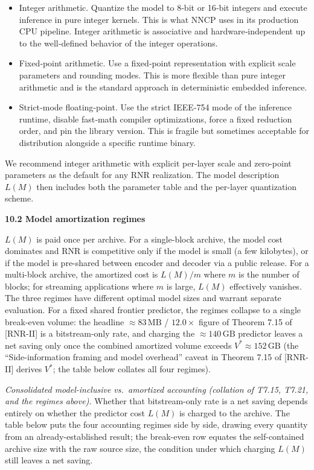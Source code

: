 \documentclass[
]{article}
\begin{document}
\begin{itemize}
\item
  Integer arithmetic. Quantize the model to 8‑bit or 16‑bit integers and
  execute inference in pure integer kernels. This is what NNCP uses in
  its production CPU pipeline. Integer arithmetic is associative and
  hardware‑independent up to the well‑defined behavior of the integer
  operations.
\item
  Fixed‑point arithmetic. Use a fixed‑point representation with explicit
  scale parameters and rounding modes. This is more flexible than pure
  integer arithmetic and is the standard approach in deterministic
  embedded inference.
\item
  Strict‑mode floating‑point. Use the strict IEEE‑754 mode of the
  inference runtime, disable fast‑math compiler optimizations, force a
  fixed reduction order, and pin the library version. This is fragile
  but sometimes acceptable for distribution alongside a specific runtime
  binary.
\end{itemize}

We recommend integer arithmetic with explicit per-layer scale and
zero-point parameters as the default for any RNR realization. The
model description $L(M)$ then includes both the parameter table and
the per-layer quantization scheme.

\textbf{10.2 Model amortization regimes}

$L(M)$ is paid once per archive. For a single-block archive, the model
cost dominates and RNR is competitive only if the model is small (a
few kilobytes), or if the model is pre-shared between encoder and
decoder via a public release. For a multi-block archive, the amortized
cost is $L(M)/m$ where $m$ is the number of blocks; for streaming
applications where $m$ is large, $L(M)$ effectively vanishes. The
three regimes have different optimal model sizes and warrant separate
evaluation. For a fixed shared frontier predictor, the regimes
collapse to a single break-even volume: the headline
$\approx 83\,\mathrm{MB}$ / $12.0\times$ figure of Theorem 7.15 of [RNR-II] is a
bitstream-only rate, and charging the $\approx 140\,\mathrm{GB}$
predictor leaves a net saving only once the combined amortized volume
exceeds $V^*\approx 152\,\mathrm{GB}$ (the ``Side-information framing
and model overhead'' caveat in Theorem 7.15 of [RNR-II] derives $V^*$; the table
below collates all four regimes).

\emph{Consolidated model-inclusive vs.\ amortized accounting (collation
of T7.15, T7.21, and the regimes above).} Whether that bitstream-only
rate is a net saving depends entirely on whether the predictor cost
$L(M)$ is charged to the archive. The table below puts the four
accounting regimes side by side, drawing every quantity from an
already-established result; the break-even row equates the
self-contained archive size with the raw source size, the condition
under which charging $L(M)$ still leaves a net saving.
\end{document}

